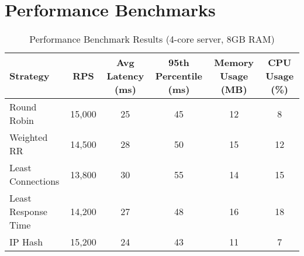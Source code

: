 \documentclass[12pt,a4paper]{article}
\begin{document}


\section{Performance Benchmarks}

\begin{table}[H]
\centering
\begin{tabular}{@{}lccccc@{}}
\toprule
\textbf{Strategy} & \textbf{RPS} & \textbf{Avg Latency (ms)} & \textbf{95th Percentile (ms)} & \textbf{Memory Usage (MB)} & \textbf{CPU Usage (\%)} \\
\midrule
Round Robin & 15,000 & 25 & 45 & 12 & 8 \\
Weighted RR & 14,500 & 28 & 50 & 15 & 12 \\
Least Connections & 13,800 & 30 & 55 & 14 & 15 \\
Least Response Time & 14,200 & 27 & 48 & 16 & 18 \\
IP Hash & 15,200 & 24 & 43 & 11 & 7 \\
\bottomrule
\end{tabular}
\caption{Performance Benchmark Results (4-core server, 8GB RAM)}
\end{table}
\end{document}
